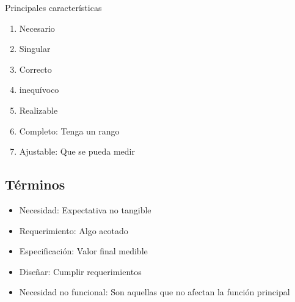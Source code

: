  Principales características
 \begin{enumerate}
     \item Necesario
     \item Singular
     \item Correcto
     \item inequívoco
     \item Realizable
     \item Completo: Tenga un rango
     \item Ajustable: Que se pueda medir
 \end{enumerate}
 
 \subsection{Términos}
 \begin{itemize}
     \item Necesidad: Expectativa no tangible
     \item Requerimiento: Algo acotado
     \item Especificación: Valor final medible
     \item Diseñar: Cumplir requerimientos
     \item Necesidad no funcional: Son aquellas que no afectan la función principal
 \end{itemize}